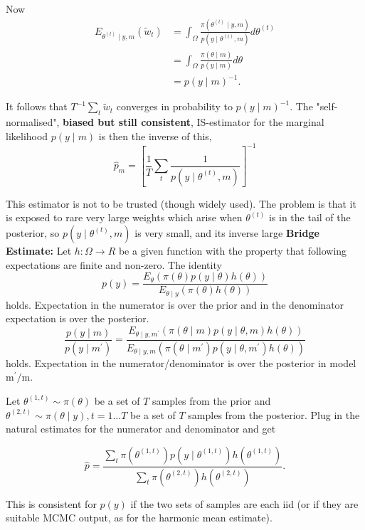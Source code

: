 \documentclass{article}
\begin{document}
Now
$$
\begin{aligned}
E_{\theta^{(t)} \mid y, m}\left(\tilde{w}_t\right) & =\int_{\Omega} \frac{\pi\left(\theta^{(t)} \mid y, m\right)}{p\left(y \mid \theta^{(t)}, m\right)} d \theta^{(t)} \\
& =\int_{\Omega} \frac{\pi(\theta \mid m)}{p(y \mid m)} d \theta \\
& =p(y \mid m)^{-1} .
\end{aligned}
$$

It follows that $T^{-1} \sum_t \tilde{w}_t$ converges in probability to $p(y \mid m)^{-1}$. The "self-normalised", \textbf{biased but still consistent}, IS-estimator for the marginal likelihood $p(y \mid m)$ is then the inverse of this,
$$
\hat{p}_m=\left[\frac{1}{T} \sum_t \frac{1}{p\left(y \mid \theta^{(t)}, m\right)}\right]^{-1}
$$

This estimator is not to be trusted (though widely used). The problem is that it is exposed to rare very large weights which arise when $\theta^{(t)}$ is in the tail of the posterior, so $p\left(y \mid \theta^{(t)}, m\right)$ is very small, and its inverse large
\newline
\textbf{Bridge Estimate:}
 Let $h: \Omega \rightarrow R$ be a given function with the property that following expectations are finite and non-zero. The identity
$$
p(y)=\frac{E_\theta(\pi(\theta) p(y \mid \theta) h(\theta))}{E_{\theta \mid y}(\pi(\theta) h(\theta))}
$$
holds. Expectation in the numerator is over the prior and in the denominator expectation is over the posterior.
$$
\frac{p(y \mid m)}{p\left(y \mid m^{\prime}\right)}=\frac{E_{\theta \mid y, m^{\prime}}(\pi(\theta \mid m) p(y \mid \theta, m) h(\theta))}{E_{\theta \mid y, m}\left(\pi\left(\theta \mid m^{\prime}\right) p\left(y \mid \theta, m^{\prime}\right) h(\theta)\right)}
$$
holds. Expectation in the numerator/denominator is over the posterior in model $\mathrm{m}^{\prime} / \mathrm{m}$.


 Let $\theta^{(1, t)} \sim \pi(\theta)$ be a set of $T$ samples from the prior and $\theta^{(2, t)} \sim \pi(\theta \mid y), t=1 \ldots T$ be a set of $T$ samples from the posterior. Plug in the natural estimates for the numerator and denominator and get

$$
\hat{p}=\frac{\sum_t \pi\left(\theta^{(1, t)}\right) p\left(y \mid \theta^{(1, t)}\right) h\left(\theta^{(1, t)}\right)}{\sum_t \pi\left(\theta^{(2, t)}\right) h\left(\theta^{(2, t)}\right)} .
$$

This is consistent for $p(y)$ if the two sets of samples are each iid (or if they are suitable MCMC output, as for the harmonic mean estimate).
\end{document}
